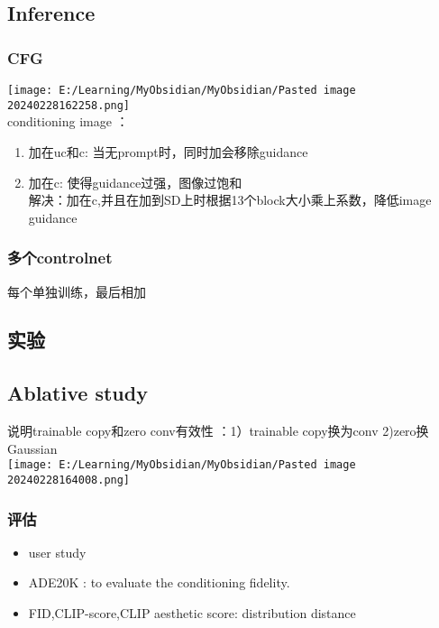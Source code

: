 \documentclass[
]{article}
\providecommand{\tightlist}{%
  \setlength{\itemsep}{0pt}\setlength{\parskip}{0pt}}
\begin{document}
\subsection{Inference}\label{inference}

\subsubsection{CFG}\label{cfg}

\texttt{[image: E:/Learning/MyObsidian/MyObsidian/Pasted image 20240228162258.png]}\\
conditioning image ：

\begin{enumerate}
\tightlist
\item
  加在uc和c: 当无prompt时，同时加会移除guidance
\item
  加在c: 使得guidance过强，图像过饱和\\
  解决：加在c,并且在加到SD上时根据13个block大小乘上系数，降低image
  guidance
\end{enumerate}

\subsubsection{多个controlnet}\label{ux591aux4e2acontrolnet}

每个单独训练，最后相加

\subsection{实验}\label{ux5b9eux9a8c}

\subsection{Ablative study}\label{ablative-study}

说明trainable copy和zero conv有效性 ：1）trainable copy换为conv
2)zero换Gaussian\\
\texttt{[image: E:/Learning/MyObsidian/MyObsidian/Pasted image 20240228164008.png]}

\subsubsection{评估}\label{ux8bc4ux4f30}

\begin{itemize}
\tightlist
\item
  user study
\item
  ADE20K : to evaluate the conditioning fidelity.
\item
  FID,CLIP-score,CLIP aesthetic score: distribution distance
\end{itemize}
\end{document}
